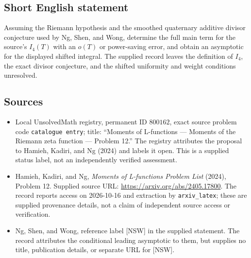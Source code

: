 \documentclass[11pt]{article}
\begin{document}
\subsection{Short English statement}
Assuming the Riemann hypothesis and the smoothed quaternary additive divisor conjecture used by Ng, Shen, and Wong, determine the full main term for the source's \(I_4(T)\) with an \(o(T)\) or power-saving error, and obtain an asymptotic for the displayed shifted integral. The supplied record leaves the definition of \(I_4\), the exact divisor conjecture, and the shifted uniformity and weight conditions unresolved.
\subsection{Sources}
\begin{itemize}
\item Local UnsolvedMath registry, permanent ID \(800162\), exact source problem code \texttt{catalogue entry}; title: ``Moments of L-functions --- Moments of the Riemann zeta function --- Problem 12.'' The registry attributes the proposal to Hamieh, Kadiri, and Ng (2024) and labels it open. This is a supplied status label, not an independently verified assessment.
\item Hamieh, Kadiri, and Ng, \emph{Moments of L-functions Problem List} (2024), Problem 12. Supplied source URL: \url{https://arxiv.org/abs/2405.17800}. The record reports access on 2026-10-16 and extraction by \texttt{arxiv\_latex}; these are supplied provenance details, not a claim of independent source access or verification.
\item Ng, Shen, and Wong, reference label [NSW] in the supplied statement. The record attributes the conditional leading asymptotic to them, but supplies no title, publication details, or separate URL for [NSW].
\end{itemize}
\end{document}
